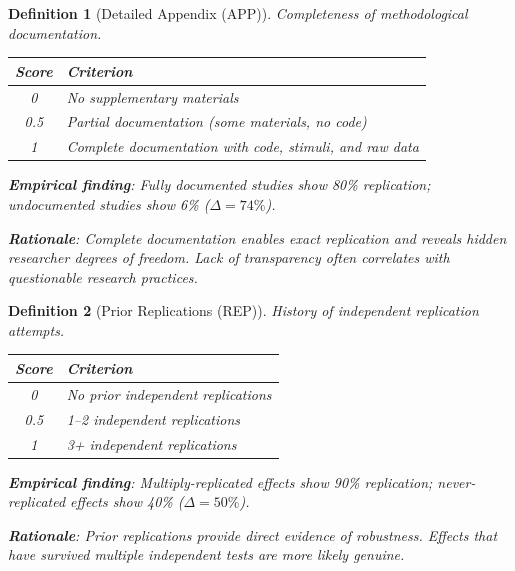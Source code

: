 \documentclass[11pt,a4paper]{article}
\newtheorem{definition}{Definition}[section]
\begin{document}
\begin{definition}[Detailed Appendix (APP)]
\label{def:app}
Completeness of methodological documentation.

\begin{center}
\begin{tabular}{cl}
\toprule
\textbf{Score} & \textbf{Criterion} \\
\midrule
0 & No supplementary materials \\
0.5 & Partial documentation (some materials, no code) \\
1 & Complete documentation with code, stimuli, and raw data \\
\bottomrule
\end{tabular}
\end{center}

\textbf{Empirical finding}: Fully documented studies show 80\% replication; undocumented studies show 6\% ($\Delta = 74\%$).

\textbf{Rationale}: Complete documentation enables exact replication and reveals hidden researcher degrees of freedom. Lack of transparency often correlates with questionable research practices.
\end{definition}

\begin{definition}[Prior Replications (REP)]
\label{def:rep}
History of independent replication attempts.

\begin{center}
\begin{tabular}{cl}
\toprule
\textbf{Score} & \textbf{Criterion} \\
\midrule
0 & No prior independent replications \\
0.5 & 1--2 independent replications \\
1 & 3+ independent replications \\
\bottomrule
\end{tabular}
\end{center}

\textbf{Empirical finding}: Multiply-replicated effects show 90\% replication; never-replicated effects show 40\% ($\Delta = 50\%$).

\textbf{Rationale}: Prior replications provide direct evidence of robustness. Effects that have survived multiple independent tests are more likely genuine.
\end{definition}
\end{document}
